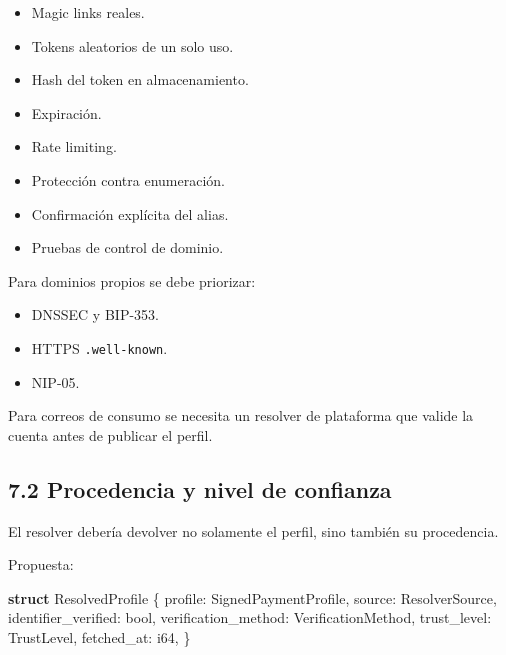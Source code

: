\documentclass[
]{article}
\newenvironment{Shaded}{}{}
\newcommand{\DataTypeTok}[1]{\textcolor[rgb]{0.56,0.13,0.00}{#1}}
\newcommand{\KeywordTok}[1]{\textcolor[rgb]{0.00,0.44,0.13}{\textbf{#1}}}
\newcommand{\NormalTok}[1]{#1}
\newcommand{\OperatorTok}[1]{\textcolor[rgb]{0.40,0.40,0.40}{#1}}
\providecommand{\tightlist}{%
  \setlength{\itemsep}{0pt}\setlength{\parskip}{0pt}}
\begin{document}
\begin{itemize}
\tightlist
\item
  Magic links reales.
\item
  Tokens aleatorios de un solo uso.
\item
  Hash del token en almacenamiento.
\item
  Expiración.
\item
  Rate limiting.
\item
  Protección contra enumeración.
\item
  Confirmación explícita del alias.
\item
  Pruebas de control de dominio.
\end{itemize}

Para dominios propios se debe priorizar:

\begin{itemize}
\tightlist
\item
  DNSSEC y BIP-353.
\item
  HTTPS \texttt{.well-known}.
\item
  NIP-05.
\end{itemize}

Para correos de consumo se necesita un resolver de plataforma que valide
la cuenta antes de publicar el perfil.

\hypertarget{procedencia-y-nivel-de-confianza}{%
\subsection{7.2 Procedencia y nivel de
confianza}\label{procedencia-y-nivel-de-confianza}}

El resolver debería devolver no solamente el perfil, sino también su
procedencia.

Propuesta:

\begin{Shaded}
\begin{Highlighting}[]
\KeywordTok{struct}\NormalTok{ ResolvedProfile }\OperatorTok{\{}
\NormalTok{    profile}\OperatorTok{:}\NormalTok{ SignedPaymentProfile}\OperatorTok{,}
\NormalTok{    source}\OperatorTok{:}\NormalTok{ ResolverSource}\OperatorTok{,}
\NormalTok{    identifier\_verified}\OperatorTok{:} \DataTypeTok{bool}\OperatorTok{,}
\NormalTok{    verification\_method}\OperatorTok{:}\NormalTok{ VerificationMethod}\OperatorTok{,}
\NormalTok{    trust\_level}\OperatorTok{:}\NormalTok{ TrustLevel}\OperatorTok{,}
\NormalTok{    fetched\_at}\OperatorTok{:} \DataTypeTok{i64}\OperatorTok{,}
\OperatorTok{\}}
\end{Highlighting}
\end{Shaded}
\end{document}
